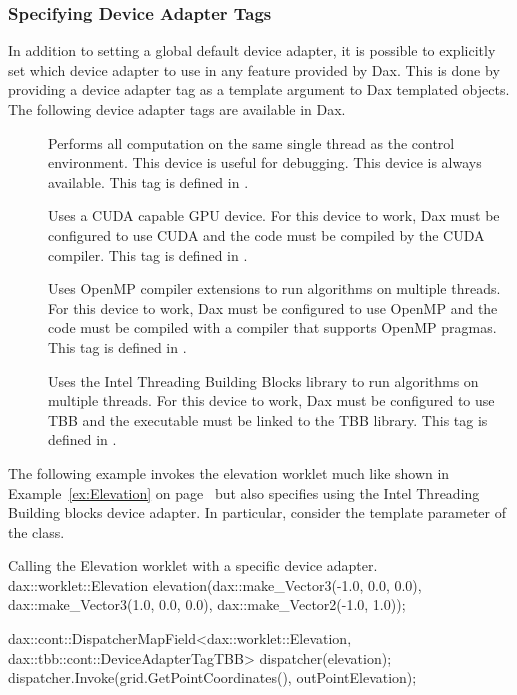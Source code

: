 \subsubsection{Specifying Device Adapter Tags}

In addition to setting a global default device adapter, it is possible to
explicitly set which device adapter to use in any feature provided by
Dax. This is done by providing a device adapter tag as a template argument
to Dax templated objects. The following device adapter tags are available
in Dax.

\begin{description}
\item[]  Performs all
  computation on the same single thread as the control environment. This
  device is useful for debugging. This device is always available. This tag
  is defined in .
\item[]  Uses a CUDA capable
  GPU device. For this device to work, Dax must be configured to use CUDA
  and the code must be compiled by the CUDA 
  compiler. This tag is defined in
  .
\item[]  Uses OpenMP
  compiler extensions to run algorithms on multiple threads. For this
  device to work, Dax must be configured to use OpenMP and the code must be
  compiled with a compiler that supports OpenMP pragmas. This tag is
  defined in .
\item[]
    Uses the Intel
  Threading Building Blocks library to run algorithms on multiple
  threads. For this device to work, Dax must be configured to use TBB and
  the executable must be linked to the TBB library. This tag is defined in
  .
\end{description}

The following example invokes the elevation worklet much like shown in
Example~\ref{ex:Elevation} on page~\pageref{ex:Elevation} but also
specifies using the Intel Threading Building blocks device adapter.
 
In particular, consider the template parameter of the
 class.
\begin{daxexample}{Calling the Elevation worklet with a specific device adapter.}
dax::worklet::Elevation elevation(dax::make_Vector3(-1.0, 0.0, 0.0),
                                  dax::make_Vector3(1.0, 0.0, 0.0),
                                  dax::make_Vector2(-1.0, 1.0));

dax::cont::DispatcherMapField<dax::worklet::Elevation, dax::tbb::cont::DeviceAdapterTagTBB>
    dispatcher(elevation);
dispatcher.Invoke(grid.GetPointCoordinates(), outPointElevation);
\end{daxexample}

